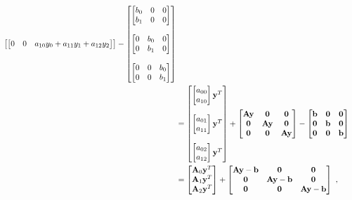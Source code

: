\begin{align}
\begin{bmatrix}
\begin{bmatrix}
0 & 0 & a_{10} y_0 + a_{11} y_1 + a_{12} y_2
\end{bmatrix}
\end{bmatrix}
-
\begin{bmatrix}
\begin{bmatrix}
b_0 & 0 & 0 \\
b_1 & 0 & 0
\end{bmatrix} \\ \\
\begin{bmatrix}
0 & b_0 & 0\\
0 & b_1 & 0
\end{bmatrix} \\ \\
\begin{bmatrix}
0 & 0 & b_0\\
0 & 0 & b_1
\end{bmatrix}
\end{bmatrix} \nonumber \\
&=
\begin{bmatrix}
\begin{bmatrix}
a_{00} \\
a_{10}
\end{bmatrix} \mathbf{y}^T \\ \\
\begin{bmatrix}
a_{01} \\
a_{11}
\end{bmatrix} \mathbf{y}^T \\ \\
\begin{bmatrix}
a_{02} \\
a_{12}
\end{bmatrix} \mathbf{y}^T
\end{bmatrix}
+
\begin{bmatrix}
\mathbf{A} \mathbf{y} & \mathbf{0} & \mathbf{0} \\
\mathbf{0} & \mathbf{A} \mathbf{y} & \mathbf{0} \\
\mathbf{0} & \mathbf{0} & \mathbf{A} \mathbf{y}
\end{bmatrix}
-
\begin{bmatrix}
\mathbf{b} & \mathbf{0} & \mathbf{0} \\
\mathbf{0} & \mathbf{b} & \mathbf{0} \\
\mathbf{0} & \mathbf{0} & \mathbf{b}
\end{bmatrix} \nonumber \\
&=
\begin{bmatrix}
\mathbf{A}_0 \mathbf{y}^T \\
\mathbf{A}_1 \mathbf{y}^T \\
\mathbf{A}_2 \mathbf{y}^T
\end{bmatrix}
+
\begin{bmatrix}
\mathbf{A} \mathbf{y} - \mathbf{b} & \mathbf{0} & \mathbf{0} \\
\mathbf{0} & \mathbf{A} \mathbf{y} - \mathbf{b} & \mathbf{0} \\
\mathbf{0} & \mathbf{0} & \mathbf{A} \mathbf{y} - \mathbf{b}
\end{bmatrix}\ ,
\end{align}

